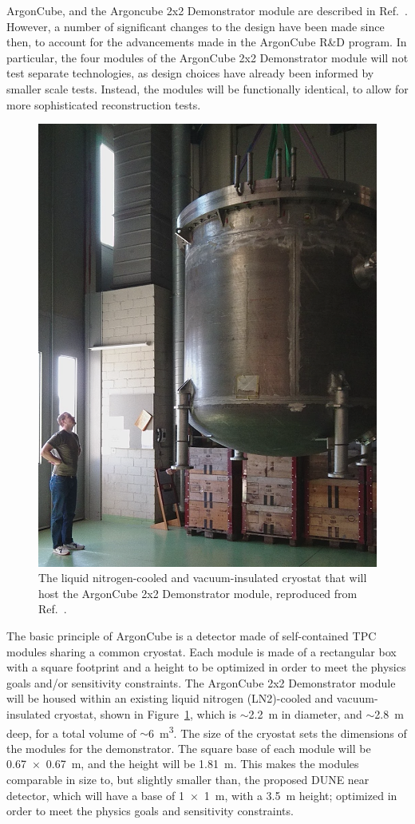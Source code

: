 ArgonCube, and the Argoncube 2x2 Demonstrator module are described in Ref.~\cite{argoncube_loi}. However, a number of significant changes to the design have been made since then, to account for the advancements made in the ArgonCube R\&D program. In particular, the four modules of the ArgonCube 2x2 Demonstrator module will not test separate technologies, as design choices have already been informed by smaller scale tests. Instead, the modules will be functionally identical, to allow for more sophisticated reconstruction tests.

\begin{figure}[htbp]
\centering
\includegraphics[width=0.45\linewidth]{plots/cryostat.png}
\caption{The liquid nitrogen-cooled and vacuum-insulated cryostat that will host the ArgonCube 2x2 Demonstrator module, reproduced from Ref.~\cite{argoncube_loi}.}
\label{fig:2x2_cryostat}
\end{figure}

The basic principle of ArgonCube is a detector made of self-contained TPC modules sharing a common cryostat. Each module is made of a rectangular box with a square footprint and a height to be optimized in order to meet the physics goals and/or sensitivity constraints. The ArgonCube 2x2 Demonstrator module will be housed within an existing liquid nitrogen (LN2)-cooled and vacuum-insulated cryostat, shown in Figure~\ref{fig:2x2_cryostat}, which is $\sim$\SI{2.2}{\metre} in diameter, and $\sim$\SI{2.8}{\metre} deep, for a total volume of $\sim$\SI{6}{\metre\cubed}. The size of the cryostat sets the dimensions of the modules for the demonstrator. The square base of each module will be \SI{0.67 x 0.67}{\metre}, and the height will be \SI{1.81}{\metre}. This makes the modules comparable in size to, but slightly smaller than, the proposed DUNE near detector, which will have a base of \SI{1 x 1}{\metre}, with a \SI{3.5}{\metre} height; optimized in order to meet the physics goals and sensitivity constraints.

